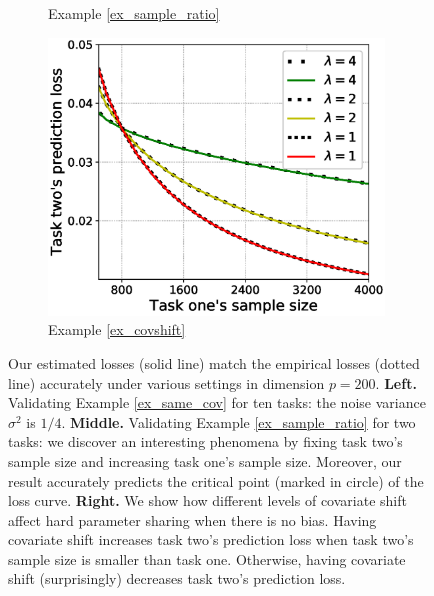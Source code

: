 \begin{figure}[!t]
\begin{subfigure}[b]{0.33\textwidth}
		\caption{Example \ref{ex_sample_ratio}}
		\label{fig_size}
	\end{subfigure}\hfill
	\begin{subfigure}[b]{0.33\textwidth}
		\centering
		\includegraphics[width=0.98\textwidth]{figures/covariate_shift.eps}
		\caption{Example \ref{ex_covshift}}
		\label{fig_covariate}
	\end{subfigure}
	\caption{%
	Our estimated losses (solid line) match the empirical losses (dotted line) accurately under various settings in dimension $p = 200$.
	\textbf{Left.} Validating Example \ref{ex_same_cov} for ten tasks: the noise variance $\sigma^2$ is $1/4$.
	\textbf{Middle.} Validating Example \ref{ex_sample_ratio} for two tasks: we discover an interesting phenomena by fixing task two's sample size and increasing task one's sample size.
	Moreover, our result accurately predicts the critical point (marked in circle) of the loss curve.
	\textbf{Right.} We show how different levels of covariate shift affect hard parameter sharing when there is no bias.
	Having covariate shift increases task two's prediction loss when task two's sample size is smaller than task one. Otherwise, having covariate shift (surprisingly) decreases task two's prediction loss.}
	\label{fig_model_shift_phasetrans}
\end{figure}



